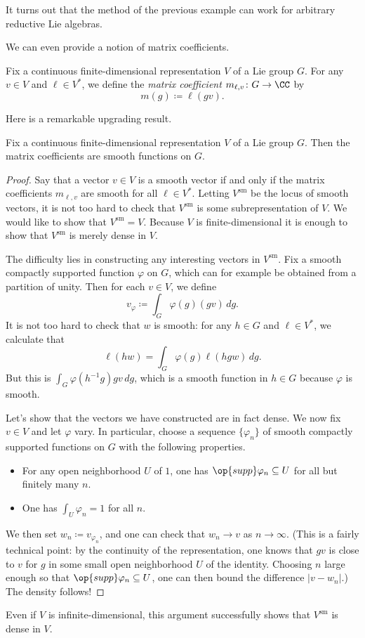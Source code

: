 \documentclass[../notes.tex]{subfiles}
\begin{document}
\begin{remark}
	It turns out that the method of the previous example can work for arbitrary reductive Lie algebras.
\end{remark}
We can even provide a notion of matrix coefficients.
\begin{definition}
	Fix a continuous finite-dimensional representation $V$ of a Lie group $G$. For any $v\in V$ and $\ell\in V^*$, we define the \textit{matrix coefficient} $m_{\ell,v}\colon G\to\CC$ by
	\[m(g)\coloneqq\ell(gv).\]
\end{definition}
Here is a remarkable upgrading result.
\begin{proposition}
	Fix a continuous finite-dimensional representation $V$ of a Lie group $G$. Then the matrix coefficients are smooth functions on $G$.
\end{proposition}
\begin{proof}
	Say that a vector $v\in V$ is a smooth vector if and only if the matrix coefficients $m_{\ell,v}$ are smooth for all $\ell\in V^*$. Letting $V^{\mathrm{sm}}$ be the locus of smooth vectors, it is not too hard to check that $V^{\mathrm{sm}}$ is some subrepresentation of $V$. We would like to show that $V^{\mathrm{sm}}=V$. Because $V$ is finite-dimensional it is enough to show that $V^{\mathrm{sm}}$ is merely dense in $V$.

	The difficulty lies in constructing any interesting vectors in $V^{\mathrm{sm}}$. Fix a smooth compactly supported function $\varphi$ on $G$, which can for example be obtained from a partition of unity. Then for each $v\in V$, we define
	\[v_\varphi\coloneqq\int_G\varphi(g)(gv)\,dg.\]
	It is not too hard to check that $w$ is smooth: for any $h\in G$ and $\ell\in V^*$, we calculate that
	\[\ell(hw)=\int_G\varphi(g)\ell(hgw)\,dg.\]
	But this is $\int_G\varphi\left(h^{-1}g\right)gv\,dg$, which is a smooth function in $h\in G$ because $\varphi$ is smooth.

	Let's show that the vectors we have constructed are in fact dense. We now fix $v\in V$ and let $\varphi$ vary. In particular, choose a sequence $\{\varphi_n\}$ of smooth compactly supported functions on $G$ with the following properties.
	\begin{itemize}
		\item For any open neighborhood $U$ of $1$, one has $\op{supp}\varphi_n\subseteq U$ for all but finitely many $n$.
		\item One has $\int_U\varphi_n=1$ for all $n$.
	\end{itemize}
	We then set $w_n\coloneqq v_{\varphi_n}$, and one can check that $w_n\to v$ as $n\to\infty$. (This is a fairly technical point: by the continuity of the representation, one knows that $gv$ is close to $v$ for $g$ in some small open neighborhood $U$ of the identity. Choosing $n$ large enough so that $\op{supp}\varphi_n\subseteq U$, one can then bound the difference $\left|v-w_n\right|$.) The density follows!
\end{proof}
\begin{remark}
	Even if $V$ is infinite-dimensional, this argument successfully shows that $V^{\mathrm{sm}}$ is dense in $V$.
\end{remark}
\end{document}
